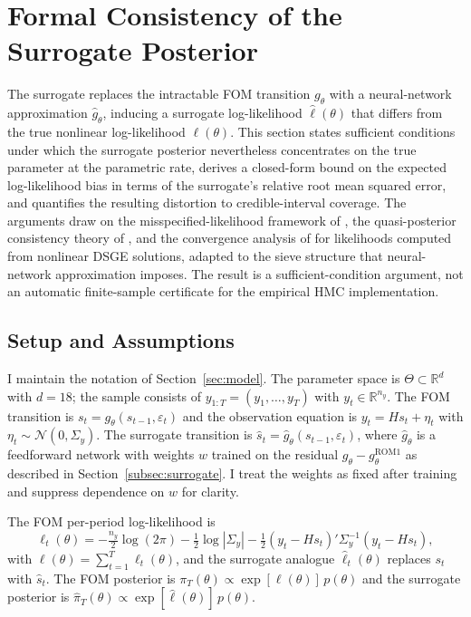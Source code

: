 \documentclass[12pt]{article}
\theoremstyle{plain}
\theoremstyle{definition}
\theoremstyle{remark}
\newcommand{\R}{\mathbb{R}}
\newcommand{\eps}{\varepsilon}
\newcommand{\Sigmay}{\Sigma_y}
\begin{document}
\section{Formal Consistency of the Surrogate Posterior}
\label{sec:formal_consistency}

The surrogate replaces the intractable FOM transition $g_\theta$ with a neural-network approximation $\hat{g}_\theta$, inducing a surrogate log-likelihood $\hat{\ell}(\theta)$ that differs from the true nonlinear log-likelihood $\ell(\theta)$. This section states sufficient conditions under which the surrogate posterior nevertheless concentrates on the true parameter at the parametric rate, derives a closed-form bound on the expected log-likelihood bias in terms of the surrogate's relative root mean squared error, and quantifies the resulting distortion to credible-interval coverage. The arguments draw on the misspecified-likelihood framework of \citet{kleijn2012bernstein}, the quasi-posterior consistency theory of \citet{mueller2013risk}, and the convergence analysis of \citet{fernandezvillaverde2006convergence} for likelihoods computed from nonlinear DSGE solutions, adapted to the sieve structure that neural-network approximation imposes. The result is a sufficient-condition argument, not an automatic finite-sample certificate for the empirical HMC implementation.

\subsection{Setup and Assumptions}

I maintain the notation of Section~\ref{sec:model}. The parameter space is $\Theta \subset \R^d$ with $d = 18$; the sample consists of $y_{1:T} = (y_1, \ldots, y_T)$ with $y_t \in \R^{n_y}$. The FOM transition is $s_t = g_\theta(s_{t-1}, \eps_t)$ and the observation equation is $y_t = Hs_t + \eta_t$ with $\eta_t \sim \mathcal{N}(0,\Sigmay)$. The surrogate transition is $\hat{s}_t = \hat{g}_\theta(s_{t-1}, \eps_t)$, where $\hat{g}_\theta$ is a feedforward network with weights $w$ trained on the residual $g_\theta - g_\theta^{\text{ROM1}}$ as described in Section~\ref{subsec:surrogate}. I treat the weights as fixed after training and suppress dependence on $w$ for clarity.

The FOM per-period log-likelihood is
\[
\ell_t(\theta) = -\tfrac{n_y}{2}\log(2\pi) - \tfrac{1}{2}\log|\Sigmay|
  - \tfrac{1}{2}(y_t - Hs_t)'\Sigmay^{-1}(y_t - Hs_t),
\]
with $\ell(\theta) = \sum_{t=1}^T \ell_t(\theta)$, and the surrogate analogue $\hat{\ell}_t(\theta)$ replaces $s_t$ with $\hat{s}_t$. The FOM posterior is $\pi_T(\theta) \propto \exp[\ell(\theta)]\,p(\theta)$ and the surrogate posterior is $\hat{\pi}_T(\theta) \propto \exp[\hat{\ell}(\theta)]\,p(\theta)$.
\end{document}

